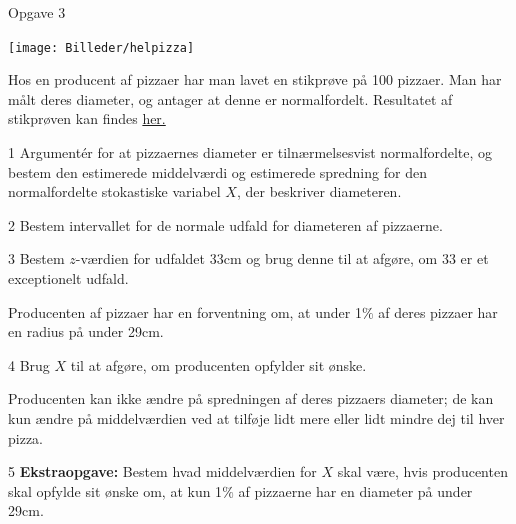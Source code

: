 \begin{opgavetekst}{Opgave 3}
	\begin{center}
		\texttt{[image: Billeder/helpizza]}
	\end{center}
	Hos en producent af pizzaer har man lavet en stikprøve på 100 pizzaer. Man har målt deres
	diameter, og antager at denne er normalfordelt. Resultatet af stikprøven kan findes 
	\href{https://github.com/ChristianJLex/TeachingNotes/raw/master/2023-2024/Data og lign/Pizzaradius.xlsx}{\color{blue!60} her.}
\end{opgavetekst}
\begin{delopgave}{}{1}
	Argumentér for at pizzaernes diameter er tilnærmelsesvist normalfordelte, og bestem den 
	estimerede middelværdi og estimerede spredning for den normalfordelte stokastiske variabel
	$X$, der beskriver diameteren.
\end{delopgave}
\begin{delopgave}{}{2}
	Bestem intervallet for de normale udfald for diameteren af pizzaerne.
\end{delopgave}
\begin{delopgave}{}{3}
	Bestem $z$-værdien for udfaldet 33cm og brug denne til at afgøre, om 33 er et exceptionelt
	udfald.
\end{delopgave}
\begin{meretekst}
	Producenten af pizzaer har en forventning om, at under 1$\%$ af deres pizzaer har en radius 	på under 29cm.
\end{meretekst}
\begin{delopgave}{}{4}
	Brug $X$ til at afgøre, om producenten opfylder sit ønske.
\end{delopgave}
\begin{meretekst}
	Producenten kan ikke ændre på spredningen af deres pizzaers diameter; de kan kun ændre på 
	middelværdien ved at tilføje lidt mere eller lidt mindre dej til hver pizza.
\end{meretekst}
\begin{delopgave}{}{5}
	\textbf{Ekstraopgave:} Bestem hvad middelværdien for $X$ skal være, hvis producenten skal
	opfylde sit ønske om, at kun 1$\%$ af pizzaerne har en diameter på under 29cm.
\end{delopgave}
